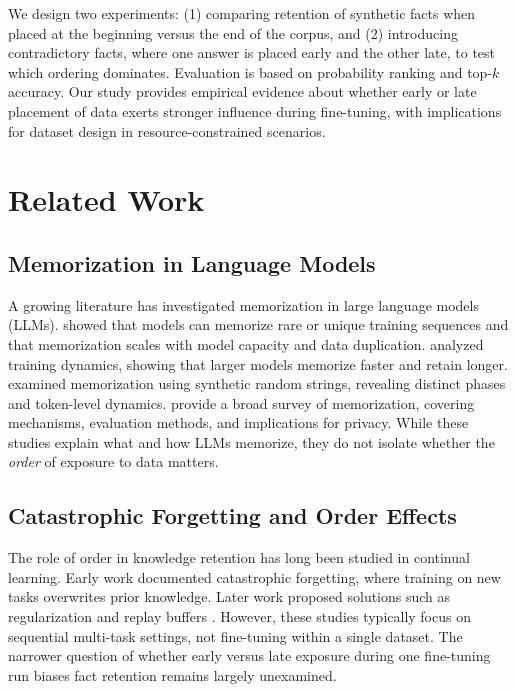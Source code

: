 \documentclass[11pt]{article}
\begin{document}
We design two experiments: (1) comparing retention of synthetic facts when placed at the beginning versus the end of the corpus, and (2) introducing contradictory facts, where one answer is placed early and the other late, to test which ordering dominates. Evaluation is based on probability ranking and top-$k$ accuracy. Our study provides empirical evidence about whether early or late placement of data exerts stronger influence during fine-tuning, with implications for dataset design in resource-constrained scenarios.

\section{Related Work}

\subsection{Memorization in Language Models}
A growing literature has investigated memorization in large language models (LLMs). \citet{carlini2023quantifying} showed that models can memorize rare or unique training sequences and that memorization scales with model capacity and data duplication. \citet{tirumala2022memorization} analyzed training dynamics, showing that larger models memorize faster and retain longer. \citet{speicher2024mechanics} examined memorization using synthetic random strings, revealing distinct phases and token-level dynamics. \citet{wei2024survey} provide a broad survey of memorization, covering mechanisms, evaluation methods, and implications for privacy. While these studies explain what and how LLMs memorize, they do not isolate whether the \emph{order} of exposure to data matters.

\subsection{Catastrophic Forgetting and Order Effects}
The role of order in knowledge retention has long been studied in continual learning. Early work \citep{mccloskey1989catastrophic,french1999catastrophic} documented catastrophic forgetting, where training on new tasks overwrites prior knowledge. Later work proposed solutions such as regularization and replay buffers \citep{kirkpatrick2017overcoming,lopez2017gradient}. However, these studies typically focus on sequential multi-task settings, not fine-tuning within a single dataset. The narrower question of whether early versus late exposure during one fine-tuning run biases fact retention remains largely unexamined.
\end{document}
